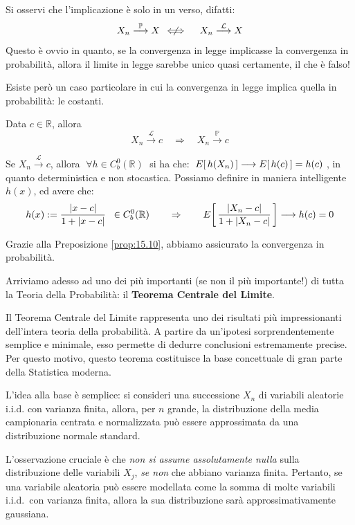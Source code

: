 \bigskip
\noindent Si osservi che l'implicazione è solo in un verso, difatti:\[X_n\overset{\mathbb P}{\longrightarrow} X \quad \not\!\!\!\!\!\iff \quad X_n\overset{\mathcal{L}}{\longrightarrow} X\]
Questo è ovvio in quanto, se la convergenza in legge implicasse la convergenza in probabilità, allora il limite in legge sarebbe unico quasi certamente, il che è falso!

\bigskip
\noindent Esiste però un caso particolare in cui la convergenza in legge implica quella in probabilità: le costanti.

\begin{teorema}
    Data $c\in\mathbb R$, allora
    \[\boxed{X_n\overset{\mathcal{L}}{\longrightarrow} c \quad \Rightarrow \quad X_n\overset{\mathbb P}{\longrightarrow} c}\]
    \begin{dimostrazione}
        Se $X_n\overset{\mathcal{L}}{\longrightarrow} c$, allora $\;\forall h\in C^0_b(\mathbb{R})\;$ si ha che: $\;E\!\left[\,h(X_n)\,\right]\longrightarrow E\!\left[\,h(c)\,\right] = h(c)\;$, in quanto deterministica e non stocastica. Possiamo definire in maniera intelligente $h(x)$, ed avere che:
        \[h(x) := \frac{|x-c|}{1 + |x - c|}\;\; \in C^0_b(\mathbb{R})\qquad \Rightarrow\qquad E\!\left[\,\frac{|X_n-c|}{1 + |X_n - c|}\,\right]\longrightarrow h(c) = 0\]
        
        Grazie alla Preposizione \ref{prop:15.10}, abbiamo assicurato la convergenza in probabilità.
    \end{dimostrazione}
\end{teorema}

\bigskip
\noindent Arriviamo adesso ad uno dei più importanti (se non il più importante!) di tutta la Teoria della Probabilità: il \textbf{Teorema Centrale del Limite}.

\bigskip
\noindent Il Teorema Centrale del Limite rappresenta uno dei risultati più impressionanti dell’intera teoria della probabilità. A partire da un’ipotesi sorprendentemente semplice e minimale, esso permette di dedurre conclusioni estremamente precise. Per questo motivo, questo teorema costituisce la base concettuale di gran parte della Statistica moderna.

\medskip
\noindent L'idea alla base è semplice: si consideri una successione 
$X_n$ di variabili aleatorie i.i.d. con varianza finita, allora, per $n$ grande, la distribuzione della media campionaria centrata e normalizzata può essere approssimata da una distribuzione normale standard.

\medskip
\noindent 
L'osservazione cruciale è che \emph{non si assume assolutamente nulla} sulla 
distribuzione delle variabili $X_j$, \emph{se non} che abbiano varianza finita. 
Pertanto, se una variabile aleatoria può essere modellata come la somma di 
molte variabili i.i.d.\ con varianza finita, allora la sua distribuzione sarà 
approssimativamente gaussiana.

